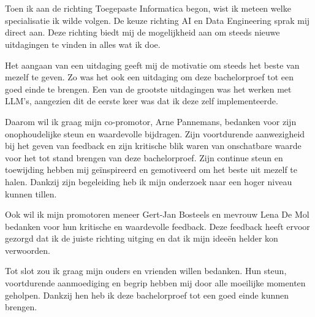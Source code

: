 
\chapter*{}%
\label{ch:voorwoord}


Toen ik aan de richting Toegepaste Informatica begon, wist ik meteen welke specialisatie ik wilde volgen. 
De keuze richting AI en Data Engineering sprak mij direct aan. 
Deze richting biedt mij de mogelijkheid aan om steeds nieuwe uitdagingen te vinden in alles wat ik doe.

Het aangaan van een uitdaging geeft mij de motivatie om steeds het beste van mezelf te geven. 
Zo was het ook een uitdaging om deze bachelorproef tot een goed einde te brengen. 
Een van de grootste uitdagingen was het werken met LLM's, aangezien dit de eerste keer was dat ik deze zelf implementeerde.

Daarom wil ik graag mijn co-promotor, Arne Pannemans, bedanken voor zijn onophoudelijke steun en waardevolle bijdragen. 
Zijn voortdurende aanwezigheid bij het geven van feedback en zijn kritische blik waren van onschatbare waarde voor het tot stand brengen van deze bachelorproef. 
Zijn continue steun en toewijding hebben mij geïnspireerd en gemotiveerd om het beste uit mezelf te halen. 
Dankzij zijn begeleiding heb ik mijn onderzoek naar een hoger niveau kunnen tillen.

Ook wil ik mijn promotoren meneer Gert-Jan Bosteels en mevrouw Lena De Mol bedanken voor hun kritische en waardevolle feedback. 
Deze feedback heeft ervoor gezorgd dat ik de juiste richting uitging en dat ik mijn ideeën helder kon verwoorden.

Tot slot zou ik graag mijn ouders en vrienden willen bedanken. Hun steun, voortdurende aanmoediging en begrip hebben mij door alle moeilijke momenten geholpen. 
Dankzij hen heb ik deze bachelorproef tot een goed einde kunnen brengen.
